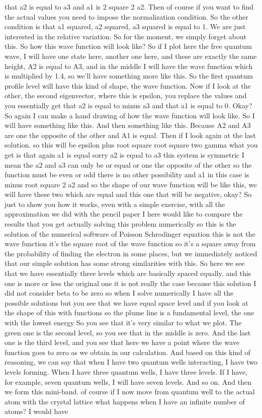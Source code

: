 that a2 is equal to a3 and a1 is 2 square 2 a2. Then of course if you want to find the actual values you need to impose the normalization condition. So the other condition is that a1 squared, a2 squared, a3 squared is equal to 1. We are just interested in the relative variation. So for the moment, we simply forget about this. So how this wave function will look like? So if I plot here the free quantum wave, I will have one state here, another one here, and these are exactly the same height, A2 is equal to A3, and in the middle I will have the wave function which is multiplied by 1.4, so we'll have something more like this. So the first quantum profile level will have this kind of shape, the wave function. Now if I look at the other, the second eigenvector, where this is epsilon, you replace the values and you essentially get that a2 is equal to minus a3 and that a1 is equal to 0. Okay? So again I can make a hand drawing of how the wave function will look like. So I will have something like this. And then something like this. Because A2 and A3 are one the opposite of the other and A1 is equal. Then if I look again at the last solution. so this will be epsilon plus root square root square two gamma what you get is that again a1 is equal sorry a2 is equal to a3 this system is symmetric I mean the a2 and a3 can only be or equal or one the opposite of the other so the function must be even or odd there is no other possibility and a1 in this case is minus root square 2 a2 and so the shape of our wave function will be like this, we will have these two which are equal and this one that will be negative, okay? So just to show you how it works, even with a simple exercise, with all the approximation we did with the pencil paper I here would like to compare the results that you get actually solving this problem numerically so this is the solution of the numerical software of Poisson Schrodinger equation this is not the wave function it's the square root of the wave function so it's a square away from the probability of finding the electron in some places, but we immediately noticed that our simple solution has some strong similarities with this. So here we see that we have essentially three levels which are basically spaced equally. and this one is more or less the original one it is not really the case because this solution I did not consider beta to be zero so when I solve numerically I have all the possible solutions but you see that we have equal space level and if you look at the shape of this with functions so the plume line is a fundamental level, the one with the lowest energy So you see that it's very similar to what we plot. The green one is the second level, so you see that in the middle is zero. And the last one is the third level, and you see that here we have a point where the wave function goes to zero as we obtain in our calculation. And based on this kind of reasoning, we can say that when I have two quantum wells interacting, I have two levels forming. When I have three quantum wells, I have three levels. If I have, for example, seven quantum wells, I will have seven levels. And so on. And then we form this mini-band. of course if I now move from quantum well to the actual atom with the crystal lattice what happens when I have an infinite number of atoms? I would have 
